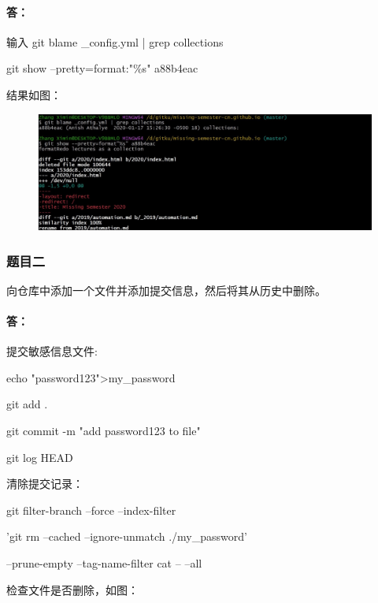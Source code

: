 \documentclass[a4paper, 12pt]{article}
\begin{document}
	\paragraph{答：}
	输入 git blame \_config.yml | grep collections
	
	git show --pretty=format:"\%s" a88b4eac
	
	结果如图：
	
	\begin{figure}[H]
		\centering
		\includegraphics[width=1\textwidth]{005.jpg}
	\end{figure}
	
	\subsubsection{题目二}
	向仓库中添加一个文件并添加提交信息，然后将其从历史中删除。
	
	\paragraph{答：}
	提交敏感信息文件:
	
	echo "password123">my\_password
	
	git add .
	
	git commit -m "add password123 to file"
	
	git log HEAD
	
	清除提交记录：
	
	git filter-branch --force --index-filter\
	
	'git rm --cached --ignore-unmatch ./my\_password' \
	
	--prune-empty --tag-name-filter cat -- --all
	
	检查文件是否删除，如图：
	
\end{document}
